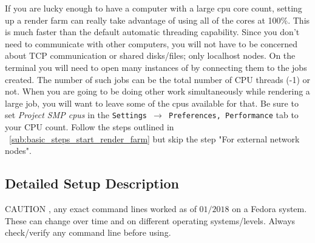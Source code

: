 If you are lucky enough to have a computer with a large cpu core
count, setting up a render farm can really take advantage of using
all of the cores at 100\%. This is much faster than the default automatic
threading capability. Since you don’t need to communicate with other
computers, you will not have to be concerned about TCP communication
or shared disks/files; only localhost nodes. On the terminal you will need to open many instances of \CGG{} by connecting them to the jobs created. The number of such jobs can be the total number of CPU threads (-1) or not. When you are going to be doing other work
simultaneously while rendering a large job, you will want to leave
some of the cpus available for that.  Be sure to set \textit{Project SMP cpus} in the \texttt{Settings $\rightarrow$ Preferences, Performance} tab to your CPU
count.  Follow the steps outlined in ~\ref{sub:basic_steps_start_render_farm}
but skip the step "For external network nodes".

\subsection{Detailed Setup Description}%
\label{sub:detailed_setup_description}

{\color{red} CAUTION }, any exact command lines worked as of
$01/2018$ on a Fedora system.  These can change over time and on
different operating systems/levels.  Always check/verify any command
line before using.

